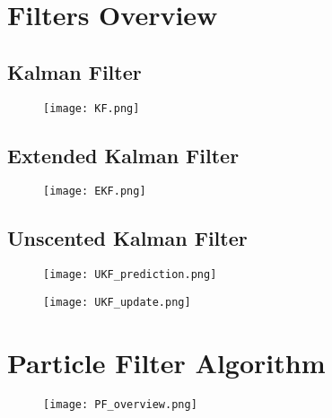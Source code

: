 
\chapter{Filters Overview}

\section{Kalman Filter}
\begin{figure}[H]
  \centering
  \texttt{[image: KF.png]}
\end{figure}

\section{Extended Kalman Filter}
\begin{figure}[H]
  \centering
  \texttt{[image: EKF.png]}
\end{figure}

\section{Unscented Kalman Filter}
\begin{figure}[H]
  \centering
  \texttt{[image: UKF\_prediction.png]}
\end{figure}

\begin{figure}[H]
  \centering
  \texttt{[image: UKF\_update.png]}
\end{figure}

\chapter{Particle Filter Algorithm}
\begin{figure}[H]
  \centering
  \texttt{[image: PF\_overview.png]}
\end{figure}

